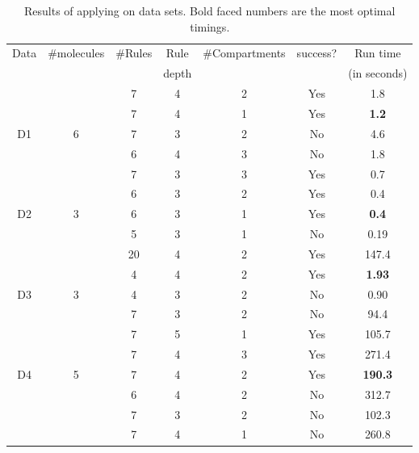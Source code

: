 \begin{table}[t]
  \centering
  \begin{tabular}[t]{|c|c|c|c|c|c|c|}\hline
    Data & \#molecules & \#Rules & Rule  & \#Compartments & success? & Run time \\
         &             &         & depth &               &          & (in seconds) \\\hline
         &   & 7  & 4 & 2 & Yes & 1.8  \\\cline{3-7}
         &   & 7  & 4 & 1 & Yes & {\bf 1.2}  \\\cline{3-7}
    D1   & 6 & 7  & 3 & 2 & No  & 4.6  \\\cline{3-7}
         &   & 6  & 4 & 3 & No  & 1.8  \\\hline
    
         &   & 7  & 3 & 3 & Yes & 0.7  \\\cline{3-7}
         &   & 6  & 3 & 2 & Yes & 0.4  \\\cline{3-7}
    D2   & 3 & 6  & 3 & 1 & Yes & {\bf 0.4}  \\\cline{3-7}
         &   & 5  & 3 & 1 & No  & 0.19 \\\hline

         &   & 20 & 4 & 2 & Yes & 147.4 \\\cline{3-7}
         &   & 4  & 4 & 2 & Yes & {\bf 1.93}  \\\cline{3-7}
    D3   & 3 & 4  & 3 & 2 & No  & 0.90  \\\cline{3-7}
         &   & 7  & 3 & 2 & No  & 94.4  \\\hline

         &   & 7 & 5 & 1 & Yes & 105.7 \\\cline{3-7}
         &   & 7 & 4 & 3 & Yes & 271.4 \\\cline{3-7}
    D4   & 5 & 7 & 4 & 2 & Yes & {\bf 190.3} \\\cline{3-7}
         &   & 6 & 4 & 2 & No  & 312.7 \\\cline{3-7}
         &   & 7 & 3 & 2 & No  & 102.3 \\\cline{3-7}
         &   & 7 & 4 & 1 & No  & 260.8 \\\hline

  \end{tabular}
  \caption{Results of applying \ourtool on data sets. Bold faced numbers are the most optimal timings.}
  \label{tab:results}
\end{table}
